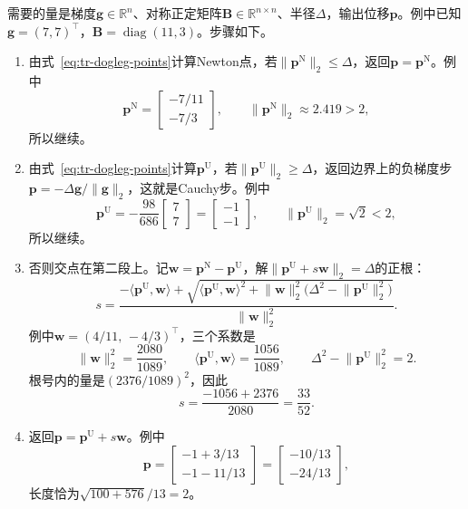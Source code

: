 需要的量是梯度$\bm{g}\in\mathbb{R}^n$、对称正定矩阵$\bm{B}\in\mathbb{R}^{n\times n}$、半径$\Delta$，输出位移$\bm{p}$。例中已知$\bm{g}=(7,7)^\top$，$\bm{B}=\operatorname{diag}(11,3)$。步骤如下。

\begin{enumerate}
 \item 由式~\eqref{eq:tr-dogleg-points}计算Newton点，若$\lVert\bm{p}^{\mathrm{N}}\rVert_2\leq\Delta$，返回$\bm{p}=\bm{p}^{\mathrm{N}}$。例中
 \[
  \bm{p}^{\mathrm{N}}=\begin{bmatrix}-7/11\\-7/3\end{bmatrix},\qquad\lVert\bm{p}^{\mathrm{N}}\rVert_2\approx2.419>2,
 \]
 所以继续。
 \item 由式~\eqref{eq:tr-dogleg-points}计算$\bm{p}^{\mathrm{U}}$，若$\lVert\bm{p}^{\mathrm{U}}\rVert_2\geq\Delta$，返回边界上的负梯度步$\bm{p}=-\Delta\bm{g}/\lVert\bm{g}\rVert_2$，这就是Cauchy步。例中
 \[
  \bm{p}^{\mathrm{U}}=-\frac{98}{686}\begin{bmatrix}7\\7\end{bmatrix}=\begin{bmatrix}-1\\-1\end{bmatrix},\qquad\lVert\bm{p}^{\mathrm{U}}\rVert_2=\sqrt2<2,
 \]
 所以继续。
 \item 否则交点在第二段上。记$\bm{w}=\bm{p}^{\mathrm{N}}-\bm{p}^{\mathrm{U}}$，解$\lVert\bm{p}^{\mathrm{U}}+s\bm{w}\rVert_2=\Delta$的正根：
 \begin{equation}
  s=\frac{-\langle\bm{p}^{\mathrm{U}},\bm{w}\rangle+\sqrt{\langle\bm{p}^{\mathrm{U}},\bm{w}\rangle^2+\lVert\bm{w}\rVert_2^2\bigl(\Delta^2-\lVert\bm{p}^{\mathrm{U}}\rVert_2^2\bigr)}}{\lVert\bm{w}\rVert_2^2}.
  \label{eq:tr-boundary-root}
 \end{equation}
 例中$\bm{w}=(4/11,\,-4/3)^\top$，三个系数是
 \[
  \lVert\bm{w}\rVert_2^2=\frac{2080}{1089},\qquad\langle\bm{p}^{\mathrm{U}},\bm{w}\rangle=\frac{1056}{1089},\qquad\Delta^2-\lVert\bm{p}^{\mathrm{U}}\rVert_2^2=2.
 \]
 根号内的量是$(2376/1089)^2$，因此
 \[
  s=\frac{-1056+2376}{2080}=\frac{33}{52}.
 \]
 \item 返回$\bm{p}=\bm{p}^{\mathrm{U}}+s\bm{w}$。例中
 \[
  \bm{p}=\begin{bmatrix}-1+3/13\\-1-11/13\end{bmatrix}=\begin{bmatrix}-10/13\\-24/13\end{bmatrix},
 \]
 长度恰为$\sqrt{100+576}/13=2$。
\end{enumerate}

